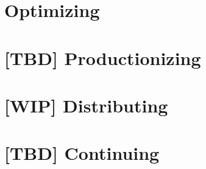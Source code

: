 \documentclass[12pt, a4paper, twoside]{extreport}
\begin{document}
\newpage
\section{Optimizing}









\newpage
\section{[TBD] Productionizing}


\newpage
\section{[WIP] Distributing}





\newpage
\section*{[TBD] Continuing}



\thispagestyle{empty}



~
\end{document}
